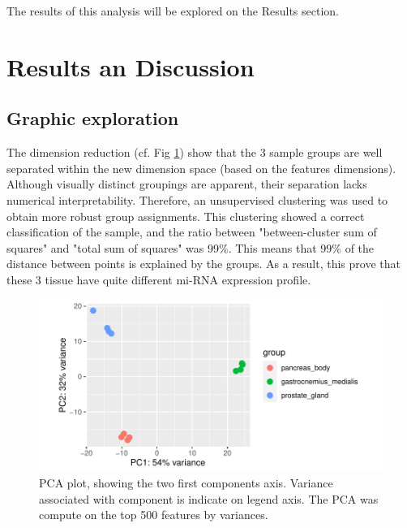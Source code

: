 \documentclass[a4paper, 11pt]{article}
\begin{document}
\begin{multicols}{2}
The results of this analysis will be explored on the Results section.



\section{Results an Discussion}

\subsection{Graphic exploration}

The dimension reduction (cf. Fig \ref{fig:pca}) show that the 3 sample groups are well separated within the new dimension space (based on the features dimensions). Although visually distinct groupings are apparent, their separation lacks numerical interpretability. Therefore, an unsupervised clustering was used to obtain more robust group assignments. This clustering showed a correct classification of the sample, and the ratio between "between-cluster sum of squares" and  "total sum of squares" was 99\%. This means that 99\% of the distance between points is explained by the groups. As a result, this prove that these 3 tissue have quite different mi-RNA expression profile.

\begin{figure}[H]
	\centering
	\includegraphics[width=\columnwidth]{Figures/differential_analysis/pca.pdf}
	\caption{\footnotesize{PCA plot, showing the two first components axis. Variance associated with component is indicate on legend axis. The PCA was compute on the top 500 features by variances.}}
	\label{fig:pca}
\end{figure}



\end{multicols}
\end{document}
